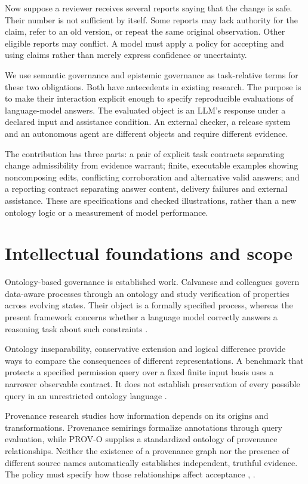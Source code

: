 \documentclass[a4paper,preprint,12pt,numbers,nopreprintline]{elsarticle}
\begin{document}
Now suppose a reviewer receives several reports saying that the change is safe. Their number is not sufficient by itself. Some reports may lack authority for the claim, refer to an old version, or repeat the same original observation. Other eligible reports may conflict. A model must apply a policy for accepting and using claims rather than merely express confidence or uncertainty.

We use semantic governance and epistemic governance as task-relative terms for these two obligations. Both have antecedents in existing research. The purpose is to make their interaction explicit enough to specify reproducible evaluations of language-model answers. The evaluated object is an LLM's response under a declared input and assistance condition. An external checker, a release system and an autonomous agent are different objects and require different evidence.

The contribution has three parts: a pair of explicit task contracts separating change admissibility from evidence warrant; finite, executable examples showing noncomposing edits, conflicting corroboration and alternative valid answers; and a reporting contract separating answer content, delivery failures and external assistance. These are specifications and checked illustrations, rather than a new ontology logic or a measurement of model performance.

\section{Intellectual foundations and scope}

Ontology-based governance is established work. Calvanese and colleagues govern data-aware processes through an ontology and study verification of properties across evolving states. Their object is a formally specified process, whereas the present framework concerns whether a language model correctly answers a reasoning task about such constraints \citep{calvanese}.

Ontology inseparability, conservative extension and logical difference provide ways to compare the consequences of different representations. A benchmark that protects a specified permission query over a fixed finite input basis uses a narrower observable contract. It does not establish preservation of every possible query in an unrestricted ontology language \citep{botoeva}.

Provenance research studies how information depends on its origins and transformations. Provenance semirings formalize annotations through query evaluation, while PROV-O supplies a standardized ontology of provenance relationships. Neither the existence of a provenance graph nor the presence of different source names automatically establishes independent, truthful evidence. The policy must specify how those relationships affect acceptance \citep{green}, \citep{provo}.
\end{document}
